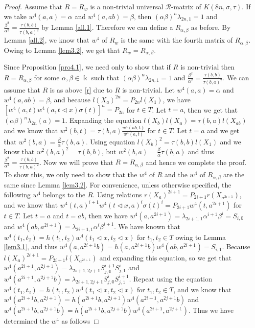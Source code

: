 \documentclass[a4paper,11pt]{amsart}
\numberwithin{equation}{section}
\begin{document}
\begin{proof}
Assume that $R=R_{w}$ is a non-trivial universal $\mathcal{R}$-matrix of $K(8n,\sigma,\tau)$.  If we take $w^4(a,a)=\alpha$ and $w^4(a,ab)=\beta$, then $(\alpha\beta)^n \lambda_{2n,1}=1$ and $\frac{\beta^2}{\alpha^2}=\frac{\tau(b,b)}{\tau(b,a)^2}$ by Lemma \ref{all.1}. Therefore we can define a $R_{\alpha,\beta}$ as before. By Lemma \ref{all.2}, we know that $w^4$ of $R_{w}$ is the
same with the fourth matrix of $R_{\alpha,\beta}$.  Owing to Lemma \ref{lem3.2}, we get that $R_{w}=R_{\alpha,\beta}$.

\iffalse Since Proposition \ref{pro4.1}, we need only to show that if $R$ is non-trivial then $R=R_{\alpha,\beta}$ for some $\alpha,\beta \in \Bbbk$ such that $(\alpha\beta)^n\lambda_{2n,1}=1$ and $\frac{\beta^2}{\alpha^2}=\frac{\tau(b,b)}{\tau(b,a)^2}$. We can assume that $R$ is as above \ref{r} due to $R$ is non-trivial. Let $w^4(a,a)=\alpha$ and $w^4(a,ab)=\beta$, and because $l(X_a)^{2n}=P_{2n}l(X_1)$, we have $[w^4(a,t)w^4(a,t\triangleleft x)\sigma(t)]^n=P_{2n}$ for $t\in T$. Let $t=a$, then we get that $(\alpha\beta)^n\lambda_{2n}(a)=1$. Expanding the equation $l(X_b)l(X_a)=\tau(b,a)l(X_{ab})$ and we know that $w^2(b,t)=\tau(b,a) \frac{w^4(ab,t)}{w^4(a,t)}$ for $t\in T$. Let $t=a$ and we get that $w^2(b,a)=\frac{\beta}{\alpha}\tau(b,a)$. Using equation $l(X_b)^2=\tau(b,b)l(X_1)$ and we know that $w^2(b,a)^2=\tau(b,b)$, but $w^2(b,a)=\frac{\beta}{\alpha}\tau(b,a)$ and thus $\frac{\beta^2}{\alpha^2}=\frac{\tau(b,b)}{\tau(b,a)^2}$.
 Now we will prove that $R=R_{\alpha,\beta}$ and hence we complete the proof. To show this, we only need to show that the $w^4$ of $R$ and the $w^4$ of $R_{\alpha,\beta}$ are the same since Lemma \ref{lem3.2}. For convenience, unless otherwise specified, the following $w^4$ belongs to the $R$. Using relations $r(X_a)^{2i+1}=P_{2i+1}r(X_{a^{2i+1}})$, and we know that
 $w^4(t,a)^{i+1} w^4(t\triangleleft x,a)^i \sigma(t)^i=P_{2i+1}w^4(t,a^{2i+1})$ for $t\in T$.
 Let $t=a$ and $t=ab$, then we have $w^4(a,a^{2i+1})=\lambda_{2i+1,1}\alpha^{i+1}\beta^i=S_{i,0}$ and $w^4(ab,a^{2i+1})=\lambda_{2i+1,1}\alpha^{i}\beta^{i+1}$. We have known that
 $w^4(t_1,t_2)=h(t_1,t_2)w^4(t_1\triangleleft x, t_2\triangleleft x)$ for $t_1,t_2\in T$ owing to Lemma \ref{lem3.1}, and thus $w^4(a,a^{2i+1}b)=h(a,a^{2i+1}b)w^4(ab,a^{2i+1})=S_{i,1}$. Because $l(X_a)^{2i+1}=P_{2i+1}l(X_{a^{2i+1}})$ and expanding this equation, so we get that $w^4(a^{2i+1},a^{2j+1})=\lambda_{2i+1,2j+1}S_{j,0}^{i+1}S_{j,1}^{i}$ and $w^4(a^{2i+1},a^{2j+1}b)=\lambda_{2i+1,2j+1}S_{j,0}^{i}S_{j,1}^{i+1}$. Repeat using the equation $w^4(t_1,t_2)=h(t_1,t_2)w^4(t_1\triangleleft x, t_2\triangleleft x)$ for $t_1,t_2\in T$, and we know that $w^4(a^{2i+1}b,a^{2j+1})=h(a^{2i+1}b,a^{2j+1})w^4(a^{2i+1},a^{2j+1}b)$ and $w^4(a^{2i+1}b,a^{2j+1}b)=h(a^{2i+1}b,a^{2j+1}b)w^4(a^{2i+1},a^{2j+1})$. Thus we have determined the $w^4$ as follows

\end{proof}
\end{document}
